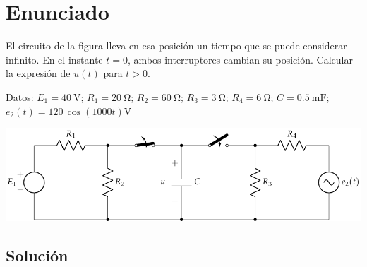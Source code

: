 \section{Enunciado}
El circuito de la figura lleva en esa posición un tiempo que se
  puede considerar infinito. En el instante $t=0$, ambos interruptores
  cambian su posición. Calcular la expresión de $u(t)$ para $t>0$.

  Datos:\; $E_1 = \qty{40}{\volt}$;\; $R_1 = \qty{20}{\ohm}$;\;
  $R_2 = \qty{60}{\ohm}$;\; $R_3 = \qty{3}{\ohm}$;\;
  $R_4 = \qty{6}{\ohm}$;\; $C = \qty{0.5}{\milli\farad}$;\;
  $e_2(t) = 120 \, \cos(1000t)\unit{\volt}$

\begin{center}
  \includegraphics{figuras/BT4_04.pdf}
\end{center}

\subsection*{Solución}

